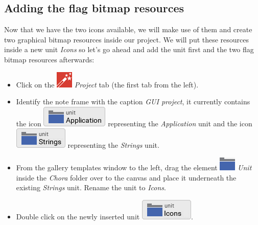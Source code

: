 \documentclass[
  a4paper,
,tablecaptionabove
]{scrbook}
\begin{document}
\hypertarget{_adding_the_flag_bitmap_resources}{%
\subsection{Adding the flag bitmap
resources}\label{_adding_the_flag_bitmap_resources}}

Now that we have the two icons available, we will make use of them and
create two graphical bitmap resources inside our project. We will put
these resources inside a new unit \emph{Icons} so let's go ahead and add
the unit first and the two flag bitmap resources afterwards:

\begin{itemize}
\item
  Click on the
  \includegraphics{./../asciidoc/modules/ROOT/assets/images/icons/EmbeddedWizardIcon.png}
  \emph{Project} tab (the first tab from the left).
\item
  Identify the note frame with the caption \emph{GUI project}, it
  currently contains the icon
  \includegraphics{./../asciidoc/modules/ROOT/assets/images/icons/ApplicationUnitIcon.png}
  representing the \emph{Application} unit and the icon
  \includegraphics{./../asciidoc/modules/ROOT/assets/images/icons/StringsUnitIcon.png}
  representing the \emph{Strings} unit.
\item
  From the gallery templates window to the left, drag the element
  \includegraphics{./../asciidoc/modules/ROOT/assets/images/icons/UnitIcon.png}
  \emph{Unit} inside the \emph{Chora} folder over to the canvas and
  place it underneath the existing \emph{Strings} unit. Rename the unit
  to \emph{Icons}.
\item
  Double click on the newly inserted unit
  \includegraphics{./../asciidoc/modules/ROOT/assets/images/icons/IconsUnitIcon.png}.

\end{itemize}
\end{document}
